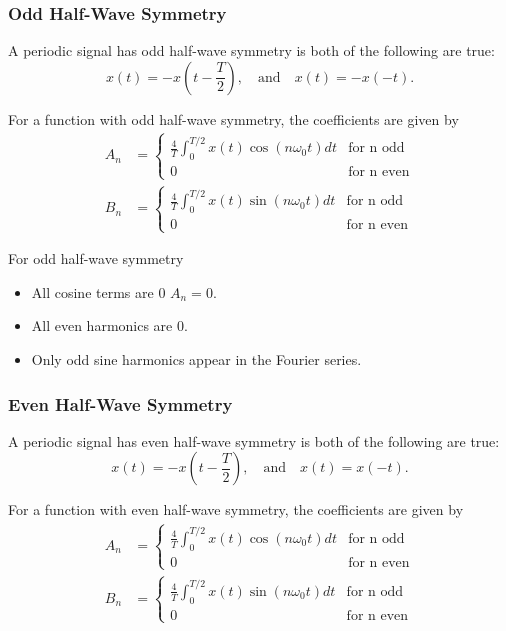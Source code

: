 \documentclass{article}
\begin{document}
\subsubsection{Odd Half-Wave Symmetry}
A periodic signal has odd half-wave symmetry is both of the following are true:
\[
    x(t)=-x \left( t-\frac{T}{2} \right),\quad \text{and}\quad x(t)=-x(-t).
\]

For a function with odd half-wave symmetry, the coefficients are given by
\begin{align*}
    A_n &= \begin{cases}
        \frac{4}{T} \int_0^{T/2}x(t)\cos(n\omega _0t)dt & \text{for n odd} \\
        0 & \text{for n even}
    \end{cases} \\
        B_n&=\begin{cases}
            \frac{4}{T}\int_0^{T/2}x(t)\sin(n\omega _0t)dt & \text{for n odd} \\
            0 & \text{for n even}
        \end{cases}
\end{align*}

For odd half-wave symmetry
\begin{itemize}
    \item All cosine terms are 0 $A_n=0$.
    \item All even harmonics are 0.
    \item Only odd sine harmonics appear in the Fourier series.
\end{itemize}

\subsubsection{Even Half-Wave Symmetry}
A periodic signal has even half-wave symmetry is both of the following are true:
\[
    x(t)=-x \left( t-\frac{T}{2} \right),\quad \text{and}\quad x(t)=x(-t).
\]

For a function with even half-wave symmetry, the coefficients are given by
\begin{align*}
    A_n &= \begin{cases}
        \frac{4}{T} \int_0^{T/2}x(t)\cos(n\omega _0t)dt & \text{for n odd} \\
        0 & \text{for n even}
    \end{cases} \\
        B_n&=\begin{cases}
            \frac{4}{T}\int_0^{T/2}x(t)\sin(n\omega _0t)dt & \text{for n odd} \\
            0 & \text{for n even}
        \end{cases}
\end{align*}
\end{document}
